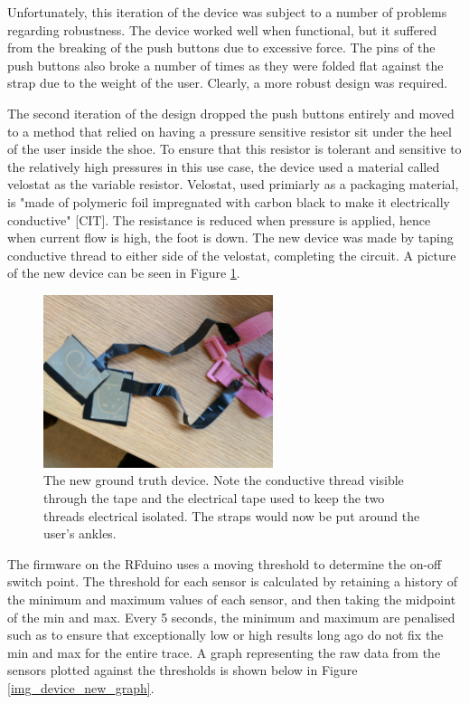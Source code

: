             Unfortunately, this iteration of the device was subject to a number of problems regarding robustness. The device worked well when functional, but it suffered from the breaking of the push buttons due to excessive force. The pins of the push buttons also broke a number of times as they were folded flat against the strap due to the weight of the user. Clearly, a more robust design was required.

            The second iteration of the design dropped the push buttons entirely and moved to a method that relied on having a pressure sensitive resistor sit under the heel of the user inside the shoe. To ensure that this resistor is tolerant and sensitive to the relatively high pressures in this use case, the device used a material called velostat as the variable resistor. Velostat, used primiarly as a packaging material, is "made of polymeric foil impregnated with carbon black to make it electrically conductive" [CIT]. The resistance is reduced when pressure is applied, hence when current flow is high, the foot is down. The new device was made by taping conductive thread to either side of the velostat, completing the circuit. A picture of the new device can be seen in Figure \ref{img_device_new}.

            \begin{figure}[!th]
                \includegraphics[width=0.6\textwidth]{Images/device_new.jpg}
                \centering
                \caption{The new ground truth device. Note the conductive thread visible through the tape and the electrical tape used to keep the two threads electrical isolated. The straps would now be put around the user's ankles.}
                \label{img_device_new}
            \end{figure}

            The firmware on the RFduino uses a moving threshold to determine the on-off switch point. The threshold for each sensor is calculated by retaining a history of the minimum and maximum values of each sensor, and then taking the midpoint of the min and max. Every 5 seconds, the minimum and maximum are penalised such as to ensure that exceptionally low or high results long ago do not fix the min and max for the entire trace. A graph representing the raw data from the sensors plotted against the thresholds is shown below in Figure \ref{img_device_new_graph}.

